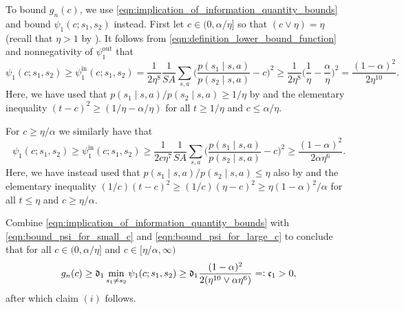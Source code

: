 \documentclass[11pt]{article}
\newcommand{\defeq}{=\vcentcolon}
\newcommand{\mf}[1]{\mathfrak{#1}}
\theoremstyle{definition}
\theoremstyle{definition}
\begin{document}
To bound $g_n(c)$, we use \eqref{eqn:implication_of_information_quantity_bounds} and bound $\psi_1(c;s_1,s_2)$ instead.
First let $c\in(0,\alpha/\eta]$ so that $(c\vee \eta)=\eta$ (recall that $\eta>1$ by ).
It follows from \eqref{eqn:definition_lower_bound_function} and nonnegativity of $\psi^{\mathrm{out}}_1$ that
\begin{equation}
	\label{eqn:bound_psi_for_small_c}
	\psi_1(c;s_1,s_2)
	\geq
	\psi_1^{\mathrm{in}}(c;s_1,s_2)
	=
	\frac{1}{2\eta^8}\frac{1}{SA}\sum_{s,a}\biggl(\frac{p(s_1\mid s,a)}{p(s_2\mid s,a)}-c\biggr)^2
	\geq
	\frac{1}{2\eta^8}\biggl(\frac{1}{\eta}-\frac{\alpha}{\eta}\biggr)^2
	=
	\frac{(1-\alpha)^2}{2\eta^{10}}
	.
\end{equation}
Here, we have used that $p(s_1\mid s,a)/p(s_2\mid s,a)\geq 1/\eta$ by  and the elementary inequality $(t-c)^2\geq (1/\eta-\alpha/\eta)$ for all $t\geq 1/\eta$ and $c\leq\alpha/\eta$.

For $c\geq \eta/\alpha$ we similarly have that
\begin{equation}
	\label{eqn:bound_psi_for_large_c}
	\psi_1(c;s_1,s_2)
	\geq
	\psi_1^{\mathrm{in}}(c;s_1,s_2)
	\geq
	\frac{1}{2c\eta^7}\frac{1}{SA}\sum_{s,a}\biggl(\frac{p(s_1\mid s,a)}{p(s_2\mid s,a)}-c\biggr)^2
	\geq
	\frac{(1-\alpha)^2}{2\alpha\eta^6}
	.
\end{equation}
Here, we have instead used that $p(s_1\mid s,a)/p(s_2\mid s,a)\leq \eta$ also by  and the elementary inequality $(1/c)(t-c)^2\geq (1/c)(\eta-c)^2\geq \eta(1-\alpha)^2/\alpha$ for all $t\leq \eta$ and $c\geq\eta/\alpha$.

Combine \eqref{eqn:implication_of_information_quantity_bounds} with \eqref{eqn:bound_psi_for_small_c} and \eqref{eqn:bound_psi_for_large_c} to conclude that for all $c\in(0,\alpha/\eta]$ and $c\in[\eta/\alpha,\infty)$
\begin{equation}
	g_n(c)
	\geq
	\mf{d}_1\min_{s_1\neq s_2}\psi_1(c;s_1,s_2)
	\geq
	\mf{d}_1\frac{(1-\alpha)^2}{2(\eta^{10}\vee\alpha\eta^6)}
	\defeq
	\mf{c}_1
	>0
	,
\end{equation}
after which claim $(i)$ follows.
\end{document}
